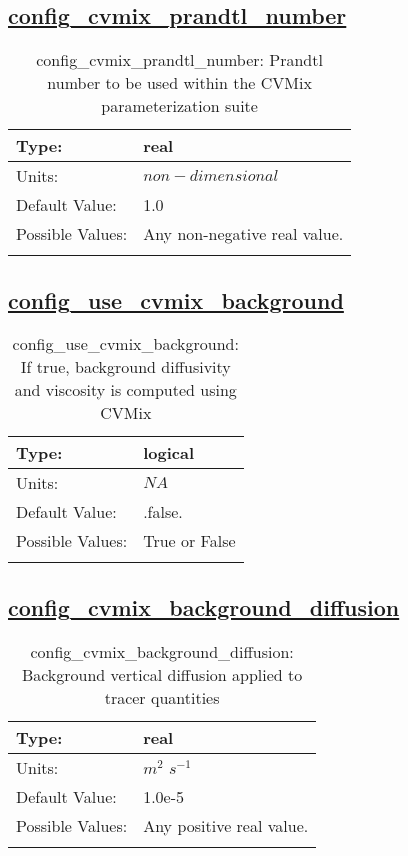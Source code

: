 \subsection[config\_cvmix\_prandtl\_number]{\hyperref[sec:nm_tab_cvmix]{config\_cvmix\_prandtl\_number}}
\label{subsec:nm_sec_config_cvmix_prandtl_number}
\begin{center}
\begin{longtable}{| p{2.0in} || p{4.0in} |}
    \hline
    Type: & real \\
    \hline
    Units: & $non-dimensional$ \\
    \hline
    Default Value: & 1.0 \\
    \hline
    Possible Values: & Any non-negative real value. \\
    \hline
    \caption{config\_cvmix\_prandtl\_number: Prandtl number to be used within the CVMix parameterization suite}
\end{longtable}
\end{center}
\subsection[config\_use\_cvmix\_background]{\hyperref[sec:nm_tab_cvmix]{config\_use\_cvmix\_background}}
\label{subsec:nm_sec_config_use_cvmix_background}
\begin{center}
\begin{longtable}{| p{2.0in} || p{4.0in} |}
    \hline
    Type: & logical \\
    \hline
    Units: & $NA$ \\
    \hline
    Default Value: & .false. \\
    \hline
    Possible Values: & True or False \\
    \hline
    \caption{config\_use\_cvmix\_background: If true, background diffusivity and viscosity is computed using CVMix}
\end{longtable}
\end{center}
\subsection[config\_cvmix\_background\_diffusion]{\hyperref[sec:nm_tab_cvmix]{config\_cvmix\_background\_diffusion}}
\label{subsec:nm_sec_config_cvmix_background_diffusion}
\begin{center}
\begin{longtable}{| p{2.0in} || p{4.0in} |}
    \hline
    Type: & real \\
    \hline
    Units: & $m^2$ $s^{-1}$ \\
    \hline
    Default Value: & 1.0e-5 \\
    \hline
    Possible Values: & Any positive real value. \\
    \hline
    \caption{config\_cvmix\_background\_diffusion: Background vertical diffusion applied to tracer quantities}
\end{longtable}
\end{center}
